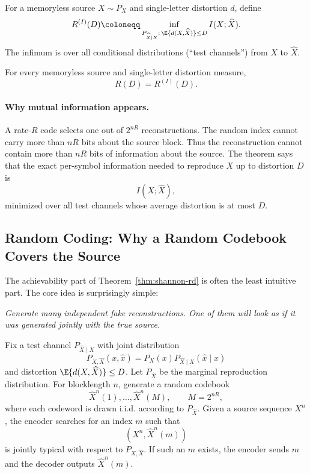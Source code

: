 \begin{definition}
\label{def:rd-info}
For a memoryless source $X\sim P_X$ and single-letter distortion $d$, define
\begin{equation}
    R^{(I)}(D)
    \coloneqq
    \inf_{P_{\widehat X\mid X}:\,\E{d(X,\widehat X)}\le D}
    I(X;\widehat X).
\end{equation}
The infimum is over all conditional distributions (``test channels'') from $X$ to $\widehat X$.
\end{definition}

\begin{theorem}
\label{thm:shannon-rd}
For every memoryless source and single-letter distortion measure,
\begin{equation}
    R(D)=R^{(I)}(D).
\end{equation}
\end{theorem}

\paragraph{Why mutual information appears.}
A rate-$R$ code selects one out of $2^{nR}$ reconstructions.
The random index cannot carry more than $nR$ bits about the source block.
Thus the reconstruction cannot contain more than $nR$ bits of information about the source.
The theorem says that the exact per-symbol information needed to reproduce $X$ up to distortion $D$ is
\[
    I(X;\widehat X),
\]
minimized over all test channels whose average distortion is at most $D$.

\subsection{Random Coding: Why a Random Codebook Covers the Source}
\label{subsec:random-coding-intuition}

The achievability part of Theorem~\ref{thm:shannon-rd} is often the least intuitive part.
The core idea is surprisingly simple:
\begin{center}
\emph{Generate many independent fake reconstructions.  One of them will look as if it was generated jointly with the true source.}
\end{center}

Fix a test channel $P_{\widehat X\mid X}$ with joint distribution
\[
    P_{X,\widehat X}(x,\hat x)=P_X(x)P_{\widehat X\mid X}(\hat x\mid x)
\]
and distortion $\E{d(X,\widehat X)}\le D$.
Let $P_{\widehat X}$ be the marginal reproduction distribution.
For blocklength $n$, generate a random codebook
\begin{equation}
    \widehat X^n(1),\ldots,\widehat X^n(M),
    \qquad M=2^{nR},
\end{equation}
where each codeword is drawn i.i.d. according to $P_{\widehat X}$.
Given a source sequence $X^n$, the encoder searches for an index $m$ such that
\[
    (X^n,\widehat X^n(m))
\]
is jointly typical with respect to $P_{X,\widehat X}$.
If such an $m$ exists, the encoder sends $m$ and the decoder outputs $\widehat X^n(m)$.


